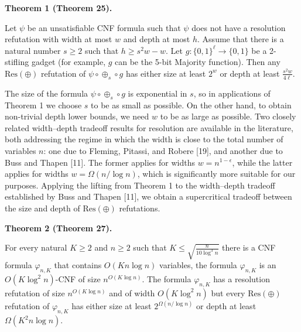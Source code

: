 \par\medskip\noindent\textbf{
Theorem 1 (Theorem 25).
}\par



Let $\psi$ be an unsatisfiable CNF formula such that $\psi$ does not have
a resolution refutation with width at most $w$ and depth at most $h$.
Assume that there is a natural number $s\geq 2$ such that $h\geq s^{2}w-w$.
Let $g\colon\{0,1\}^{\ell}\to\{0,1\}$ be a 2-stifling gadget (for example,
$g$ can be the 5-bit Majority function).
Then any $\mathrm{Res}(\oplus)$ refutation of $\psi\circ\oplus_{s}\circ g$ has either
size at least $2^{w}$ or depth at least $\frac{s^{2}w}{4\ell}$.\par




The size of the formula $\psi\circ\oplus_{s}\circ g$ is exponential in $s$, so in applications of Theorem 1 we choose $s$ to be as small as possible. On the other hand, to obtain non-trivial depth lower bounds, we need $w$ to be as large as possible.
Two closely related width–depth tradeoff results for resolution are available in the literature, both addressing the regime in which the width is close to the total number of variables $n$: one due to Fleming, Pitassi, and Robere [19], and another due to Buss and Thapen [11].
The former applies for widths $w=n^{1-\epsilon}$, while the latter applies for widths $w=\Omega(n/\log n)$, which is significantly more suitable for our purposes. Applying the lifting from Theorem 1 to the width–depth tradeoff established by Buss and Thapen [11], we obtain a supercritical tradeoff between the size and depth of $\mathrm{Res}(\oplus)$ refutations.\par



\par\medskip\noindent\textbf{
Theorem 2 (Theorem 27).
}\par



For every natural $K\geq 2$ and $n\geq 2$ such that
$K\leq\sqrt{\frac{n}{10\log^{3}n}}$ there is a CNF formula $\varphi_{n,K}$
that contains $O(Kn\log n)$ variables, the formula $\varphi_{n,K}$ is an
$O(K\log^{2}n)$-CNF of size $n^{O(K\log n)}$.
The formula $\varphi_{n,K}$ has a resolution refutation of size $n^{O(K\log n)}$
and of width $O(K\log^{2}n)$ but every $\mathrm{Res}(\oplus)$ refutation of $\varphi_{n,K}$ has either size
at least $2^{\Omega(n/\log n)}$ or depth at least $\Omega(K^{2}n\log n)$.\par




